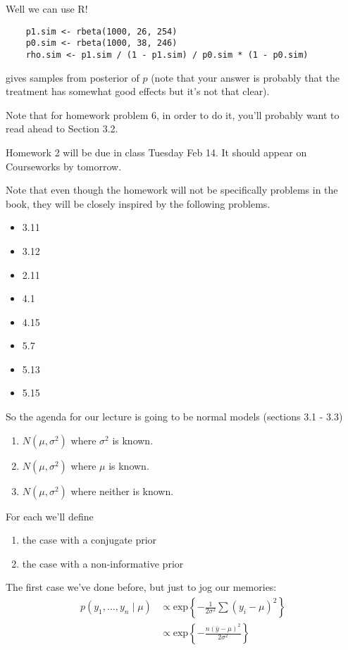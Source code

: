 \documentclass[a4paper]{article}
\begin{document}
Well we can use R!

\begin{lstlisting}
	p1.sim <- rbeta(1000, 26, 254)
	p0.sim <- rbeta(1000, 38, 246)
	rho.sim <- p1.sim / (1 - p1.sim) / p0.sim * (1 - p0.sim)
\end{lstlisting}
gives samples from posterior of $p$ (note that your answer is probably that the treatment has somewhat good effects but it's not that clear).

Note that for homework problem 6, in order to do it, you'll probably want to read ahead to Section 3.2.

Homework 2 will be due in class Tuesday Feb 14. It should appear on Courseworks by tomorrow.

Note that even though the homework will not be specifically problems in the book, they will be closely inspired by the following problems.
\begin{itemize}
	\item 
		3.11
	\item
		3.12
	\item
		2.11
	\item
		4.1
	\item
		4.15
	\item
		5.7
	\item
		5.13
	\item
		5.15
\end{itemize}

So the agenda for our lecture is going to be normal models (sections 3.1 - 3.3)

\begin{enumerate}
	\item 
		$N(\mu, \sigma ^2)$ where $\sigma ^2$ is known.
	\item
		$N(\mu, \sigma ^2)$ where $\mu$ is known.
	\item
		$N(\mu, \sigma ^2)$ where neither is known.
\end{enumerate}

For each we'll define
\begin{enumerate}
	\item 
		the case with a conjugate prior
	\item
		the case with a non-informative prior
\end{enumerate}

The first case we've done before, but just to jog our memories:
\begin{align}
	p(y_1, \ldots, y_n \mid \mu) &\propto \text{exp}\left\{ -\frac{1}{2 \sigma ^2} \sum \left( y_i - \mu \right)^2 \right\} \\
	&\propto \text{exp}\left\{ -\frac{n\left( \bar{y} - \mu \right)^2}{2 \sigma ^2} \right\}
\end{align}
\end{document}
